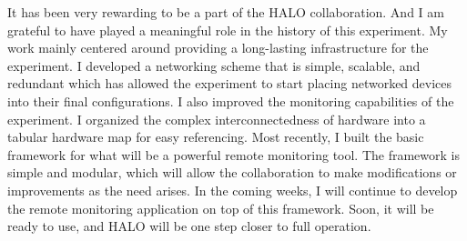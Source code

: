 	It has been very rewarding to be a part of the HALO collaboration. And I am grateful to have played a meaningful role in the history of this experiment. My work mainly centered around providing a long-lasting infrastructure for the experiment. I developed a networking scheme that is simple, scalable, and redundant which has allowed the experiment to start placing networked devices into their final configurations. I also improved the monitoring capabilities of the experiment. I organized the complex interconnectedness of hardware into a tabular hardware map for easy referencing. Most recently, I built the basic framework for what will be a powerful remote monitoring tool. The framework is simple and modular, which will allow the collaboration to make modifications or improvements as the need arises. In the coming weeks, I will continue to develop the remote monitoring application on top of this framework. Soon, it will be ready to use, and HALO will be one step closer to full operation.


